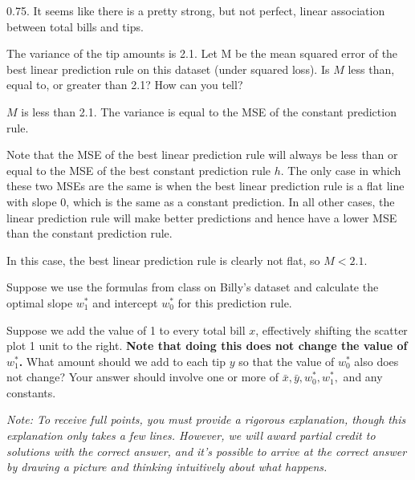 \documentclass{article}
\begin{document}
\begin{probset}
\begin{prob}
\begin{subprobset}
\begin{subprob}[2 Points]
\begin{soln}
0.75. It seems like there is a pretty strong, but not perfect, linear association between total bills and tips.

\end{soln}

\vspace{.65in}

\end{subprob}

\begin{subprob}[3 Points]
The variance of the tip amounts is 2.1. Let M be the mean squared error of the best linear prediction rule on this dataset (under squared loss). Is $M$ less than, equal to, or greater than 2.1? How can you tell?

\begin{soln}

$M$ is less than 2.1. The variance is equal to the MSE of the constant prediction rule. 

Note that the MSE of the best linear prediction rule will always be less than or equal to the MSE of the best constant prediction rule $h$. The only case in which these two MSEs are the same is when the best linear prediction rule is a flat line with slope 0, which is the same as a constant prediction. In all other cases, the linear prediction rule will make better predictions and hence have a lower MSE than the constant prediction rule. 

In this case, the best linear prediction rule is clearly not flat, so $M < 2.1$.

\end{soln}

\vspace{1in}

\end{subprob}

\begin{subprob}[4 Points]
Suppose we use the formulas from class on Billy's dataset and calculate the optimal slope $w_1^*$ and intercept $w_0^*$ for this prediction rule.

Suppose we add the value of 1 to every total bill $x$, effectively shifting the scatter plot 1 unit to the right. \textbf{Note that doing this does not change the value of $w_1^*$.} What amount should we add to each tip $y$ so that the value of $w_0^*$ also does not change? Your answer should involve one or more of $\bar{x}, \bar{y}, w_0^*, w_1^*,$ and any constants.

\textit{Note: To receive full points, you must provide a rigorous explanation, though this explanation only takes a few lines. However, we will award partial credit to solutions with the correct answer, and it's possible to arrive at the correct answer by drawing a picture and thinking intuitively about what happens.}


\end{subprob}
\end{subprobset}
\end{prob}
\end{probset}
\end{document}
